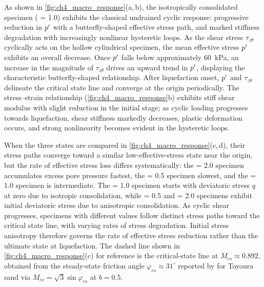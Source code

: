 \documentclass[../main]{subfiles}
\begin{document}
As shown in \cref{fig:ch4_macro_response}(a,\,b), the isotropically consolidated specimen (\Kzero{} = 1.0) exhibits the classical undrained cyclic response: progressive reduction in $p'$ with a butterfly-shaped effective stress path, and marked stiffness degradation with increasingly nonlinear hysteretic loops. As the shear stress $\tau_{z\theta}$ cyclically acts on the hollow cylindrical specimen, the mean effective stress $p'$ exhibits an overall decrease. Once $p'$ falls below approximately \SI{60}{kPa}, an increase in the magnitude of $\tau_{z\theta}$ drives an upward trend in $p'$, displaying the characteristic butterfly-shaped relationship. After liquefaction onset, $p'$ and $\tau_{z\theta}$ delineate the critical state line and converge at the origin periodically. The stress--strain relationship (\cref{fig:ch4_macro_response}b) exhibits stiff shear modulus with slight reduction in the initial stage; as cyclic loading progresses towards liquefaction, shear stiffness markedly decreases, plastic deformation occurs, and strong nonlinearity becomes evident in the hysteretic loops.

When the three \Kzero{} states are compared in \cref{fig:ch4_macro_response}(c,\,d), their stress paths converge toward a similar low-effective-stress state near the origin, but the rate of effective stress loss differs systematically: the \Kzero{} = 2.0 specimen accumulates excess pore pressure fastest, the \Kzero{} = 0.5 specimen slowest, and the \Kzero{} = 1.0 specimen is intermediate. The \Kzero{} = 1.0 specimen starts with deviatoric stress $q$ at zero due to isotropic consolidation, while \Kzero{} = 0.5 and \Kzero{} = 2.0 specimens exhibit initial deviatoric stress due to anisotropic consolidation. As cyclic shear progresses, specimens with different \Kzero{} values follow distinct stress paths toward the critical state line, with varying rates of stress degradation. Initial stress anisotropy therefore governs the rate of effective stress reduction rather than the ultimate state at liquefaction. The dashed line shown in \cref{fig:ch4_macro_response}(c) for reference is the critical-state line at $M_{cs}\approx 0.892$, obtained from the steady-state friction angle $\varphi_{cs}\approx 31^{\circ}$ reported by \citet{VerdugoIshihara1996} for Toyoura sand via $M_{cs}=\sqrt{3}\sin\varphi_{cs}$ at $b=0.5$.
\end{document}
